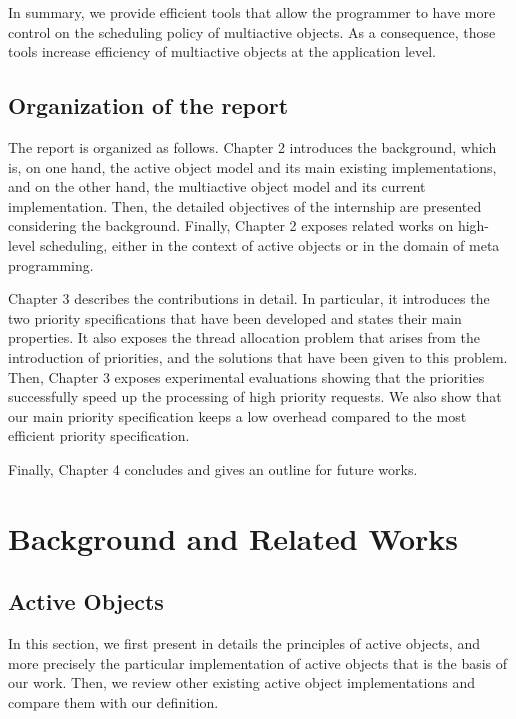 \documentclass[11pt]{report}
\begin{document}
In summary, we provide efficient tools that allow the programmer to have more control on the scheduling policy of multiactive objects. As a consequence, those tools increase efficiency of multiactive objects at the application level.


\section{Organization of the report}
The report is organized as follows. Chapter 2 introduces the background, which is, on one hand, the active object model and its main existing implementations, and on the other hand, the multiactive object model and its current implementation. Then, the detailed objectives of the internship are presented considering the background. Finally, Chapter 2 exposes related works on high-level scheduling, either in the context of active objects or in the domain of meta programming.

Chapter 3 describes the contributions in detail. In particular, it introduces the two priority specifications that have been developed and states their main properties. It also exposes the thread allocation problem that arises from the introduction of priorities, and the solutions that have been given to this problem. Then, Chapter 3 exposes experimental evaluations showing that the priorities successfully speed up the processing of high priority requests. We also show that our main priority specification keeps a low overhead compared to the most efficient priority specification.

Finally, Chapter 4 concludes and gives an outline for future works.

\chapter{Background and Related Works}
\section{Active Objects}
In this section, we first present in details the principles of active objects, and more precisely the particular implementation of active objects that is the basis of our work. Then, we review other existing active object implementations and compare them with our definition.
\end{document}
